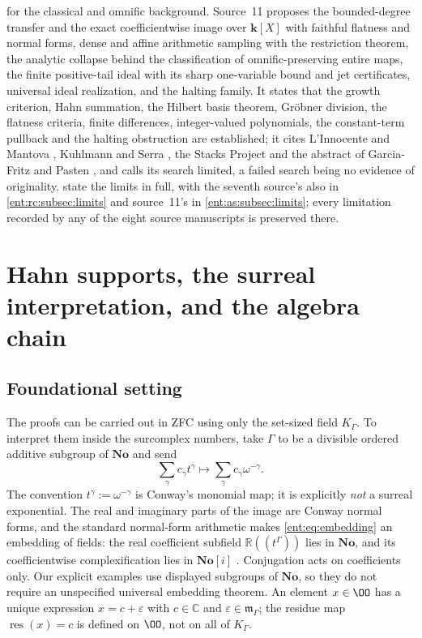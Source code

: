 \documentclass[11pt]{article}
\theoremstyle{plain}
\theoremstyle{plain}
\theoremstyle{plain}
\theoremstyle{definition}
\theoremstyle{definition}
\theoremstyle{definition}
\theoremstyle{definition}
\theoremstyle{remark}
\newcommand{\C}{\mathbb C}\newcommand{\R}{\mathbb R}
\newcommand{\No}{\mathbf{No}}
\newcommand{\K}{K_\Gamma}\newcommand{\KD}{K_\Delta}
\newcommand{\mm}{\mathfrak m_\Gamma}
\newcommand{\res}{\operatorname{res}}
\newcommand{\kk}{\mathbf k}\newcommand{\PP}{\mathbb P}
\begin{document}
\cite{LInnocenteMantova} for the classical and omnific background.
Source~11 proposes the bounded-degree transfer and the exact
coefficientwise image over $\kk[X]$ with faithful flatness and normal forms,
dense and affine arithmetic sampling with the restriction theorem, the
analytic collapse behind the classification of omnific-preserving entire
maps, the finite positive-tail ideal with its sharp one-variable bound and jet
certificates, universal ideal realization, and the halting family. It states
that the growth criterion, Hahn summation, the Hilbert basis theorem,
Gr\"obner division, the flatness criteria, finite differences, integer-valued
polynomials, the constant-term pullback and the halting obstruction are
established; it cites L'Innocente and Mantova \cite{LInnocenteMantova},
Kuhlmann and Serra \cite{KuhlmannSerra}, the Stacks Project
\cite{Stacks,StacksFlat} and the abstract of Garcia-Fritz and Pasten
\cite{GarciaFritzPasten}, and calls its search limited, a failed search being
no evidence of originality.
 state the limits in full, with the
seventh source's also in \cref{ent:rc:subsec:limits} and source~11's in
\cref{ent:as:subsec:limits}; every limitation recorded by any of the eight
source manuscripts is preserved there.

\section{Hahn supports, the surreal interpretation, and the algebra chain}
\label{ent:sec:support}

\subsection{Foundational setting}
The proofs can be carried out in ZFC using only the set-sized field $\K$. To
interpret them inside the surcomplex numbers, take $\Gamma$ to be a divisible
ordered additive subgroup of $\No$ and send
\begin{equation}\label{ent:eq:embedding}
 \sum_\gamma c_\gamma t^\gamma
 \longmapsto \sum_\gamma c_\gamma\omega^{-\gamma}.
\end{equation}
The convention $t^\gamma:=\omega^{-\gamma}$ is Conway's monomial map; it is
explicitly \emph{not} a surreal exponential. The real and imaginary parts of
the image are Conway normal forms, and the standard normal-form arithmetic
makes \eqref{ent:eq:embedding} an embedding of fields: the real coefficient
subfield $\R((t^\Gamma))$ lies in $\No$, and its coefficientwise
complexification lies in $\No[i]$ \cite{Conway,Gonshor}. Conjugation acts on
coefficients only. Our explicit examples use displayed subgroups of $\No$, so
they do not require an unspecified universal embedding theorem. An element
$x\in\OO$ has a unique expression $x=c+\varepsilon$ with $c\in\C$ and
$\varepsilon\in\mm$; the residue map $\res(x)=c$ is defined on $\OO$, not on
all of $\K$.
\end{document}
